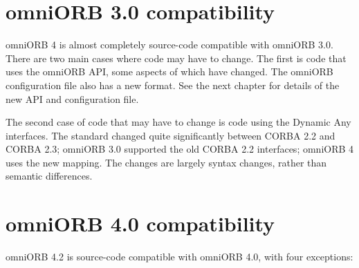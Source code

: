 \documentclass[11pt,oneside,a4paper]{book}
\begin{document}
\section{omniORB 3.0 compatibility}

omniORB 4 is almost completely source-code compatible with omniORB
3.0. There are two main cases where code may have to change. The first
is code that uses the omniORB API, some aspects of which have
changed. The omniORB configuration file also has a new format. See the
next chapter for details of the new API and configuration file.

The second case of code that may have to change is code using the
Dynamic Any interfaces. The standard changed quite significantly
between CORBA 2.2 and CORBA 2.3; omniORB 3.0 supported the old CORBA
2.2 interfaces; omniORB 4 uses the new mapping. The changes are
largely syntax changes, rather than semantic differences.


\section{omniORB 4.0 compatibility}

omniORB 4.2 is source-code compatible with omniORB 4.0, with four
exceptions:
\end{document}
